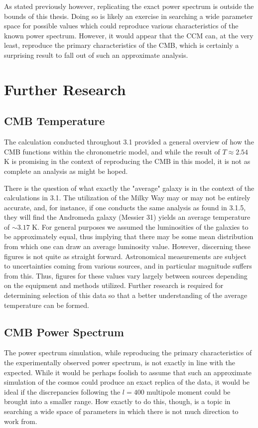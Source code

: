 \documentclass[a4paper]{article}
\begin{document}
    As stated previously however, replicating the exact power spectrum is
    outside the bounds of this thesis. Doing so is likely an exercise in
    searching a wide parameter space for possible values which could reproduce
    various characteristics of the known power spectrum. However, it would
    appear that the CCM can, at the very least, reproduce the primary
    characteristics of the CMB, which is certainly a surprising result to fall
    out of such an approximate analysis.
    \newpage
    \section{Further Research}
    \subsection{CMB Temperature}
    The calculation conducted throughout 3.1 provided a general overview of how
    the CMB functions within the chronometric model, and while the result of
    $T\approx 2.54$ K is promising in the context of reproducing the CMB in this
    model, it is not as complete an analysis as might be hoped.
    
    There is the question of what exactly the "average" galaxy is in the
    context of the calculations in 3.1. The utilization of the Milky Way may or
    may not be entirely accurate, and, for instance, if one conducts the same
    analysis as found in 3.1.5, they will find the Andromeda galaxy (Messier
    31) yields an average temperature of $\sim 3.17$ K. For general purposes we
    assumed the luminosities of the galaxies to be approximately equal, thus
    implying that there may be some mean distribution from which one can
    draw an average luminosity value. However, discerning these figures is not
    quite as straight forward. Astronomical measurements are subject to
    uncertainties coming from various sources, and in particular magnitude
    suffers from this. Thus, figures for these values vary largely between
    sources depending on the equipment and methods utilized. Further research
    is required for determining selection of this data so that a better
    understanding of the average temperature can be formed.
    \subsection{CMB Power Spectrum}
    The power spectrum simulation, while reproducing the primary 
    characteristics of the experimentally observed power spectrum, is not
    exactly in line with the expected. While it would be perhaps foolish to
    assume that such an approximate simulation of the cosmos could produce an
    exact replica of the data, it would be ideal if the discrepancies following
    the $l=400$ multipole moment could be brought into a smaller range. How
    exactly to do this, though, is a topic in searching a wide space of
    parameters in which there is not much direction to work from.
\end{document}
